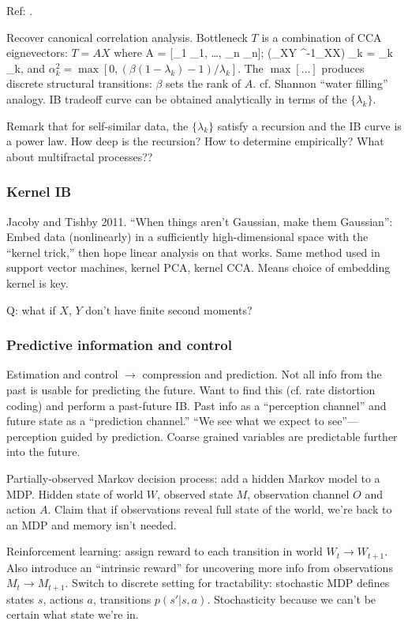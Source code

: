 \documentclass[notitlepage,openany,11pt]{report}
\theoremstyle{plain}%
\numberwithin{equation}{section}
\begin{document}
Ref: \cite{ChechikEtAl:05}. 

Recover canonical correlation analysis. Bottleneck $T$ is a combination of CCA eignevectors: $T=AX$ where
\be
A = [\alpha_{1} _{1}, \ldots, \alpha_{n} _{n}]; \qquad (\Sigma_{XY} \Sigma^{-1}_{XX}) _{k} = \lambda_{k} _{k},
\ee
and $\alpha_{k}^{2} = \max[0, (\beta(1-\lambda_{k}) -1 )/\lambda_{k}]$. The $\max[\ldots]$ produces discrete structural transitions: $\beta$ sets the rank of $A$. cf. Shannon ``water filling'' analogy. IB tradeoff curve can be obtained analytically in terms of the $\{ \lambda_{k} \}$. 

Remark that for self-similar data, the $\{ \lambda_{k} \}$ satisfy a recursion and the IB curve is a power law. How deep is the recursion? How to determine empirically? What about multifractal processes??

\subsubsection{Kernel IB} Jacoby and Tishby 2011. ``When things aren't Gaussian, make them Gaussian'': Embed data (nonlinearly) in a sufficiently high-dimensional space with the ``kernel trick,'' then hope linear analysis on that works. Same method used in support vector machines, kernel PCA, kernel CCA. Means choice of embedding kernel is key.

Q: what if $X$, $Y$ don't have finite second moments?

\subsubsection{Predictive information and control} Estimation and control $\rightarrow$ compression and prediction. Not all info from the past is usable for predicting the future. Want to find this (cf. rate distortion coding) and perform a past-future IB. Past info as a ``perception channel'' and future state as a ``prediction channel.'' ``We see what we expect to see''--- perception guided by prediction. Coarse grained variables are predictable further into the future.

Partially-observed Markov decision process: add a hidden Markov model to a MDP. Hidden state of world $W$, observed state $M$, observation channel $O$ and action $A$. Claim that if observations reveal full state of the world, we're back to an MDP and memory isn't needed. 

Reinforcement learning: assign reward to each transition in world $W_{t} \rightarrow W_{t+1}$. Also introduce an ``intrinsic reward'' for uncovering more info from observations $M_{t} \rightarrow M_{t+1}$. Switch to discrete setting for tractability: stochastic MDP defines states $s$, actions $a$, transitions $p(s'|s,a)$. Stochasticity because we can't be certain what state we're in. 
\end{document}
